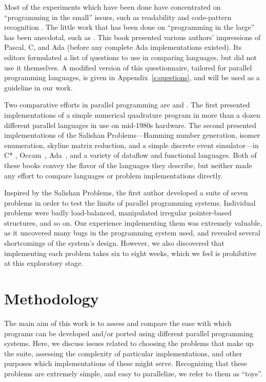 Most of the experiments which have been done have concentrated on ``programming in the small'' issues,
such as readability and code-pattern recognition
\cite{b:reverse-parsing-2,b:cloze-program-1,b:prog-comprehension-1}.
The little work that has been done on ``programming in the large'' has been anecdotal,
such as \cite{b:compare-ada-c-pascal}.
This book presented various authors' impressions of Pascal, C, and Ada
(before any complete Ada implementations existed).
Its editors formulated a list of questions to use in comparing languages,
but did not use it themselves.
A modified version of this questionnaire,
tailored for parallel programming languages,
is given in Appendix~\ref{s:questions},
and will be used as a guideline in our work.

Two comparative efforts in parallel programming are \cite{b:babb-cases} and \cite{b:salishan}.
The first presented implementations of a simple numerical quadrature program
in more than a dozen different parallel languages
in use on mid-1980s hardware.
The second presented implementations of
the Salishan Problems---Hamming number generation,
isomer enumeration,
skyline matrix reduction,
and a simple discrete event simulator---in
C* \cite{b:dataparallel-c}, Occam~\cite{b:occam}, Ada~\cite{b:ada},
and a variety of dataflow and functional languages.
Both of these books convey the flavor of the languages they describe,
but neither made any effort to compare languages or problem implementations directly.

Inspired by the Salishan Problems,
the first author developed a suite of seven problems \cite{b:cowichan-1}
in order to test the limits of parallel programming systems.
Individual problems were badly load-balanced,
manipulated irregular pointer-based structures,
and so on.
Our experience implementing them was extremely valuable,
as it uncovered many bugs in the programming system used,
and revealed several shortcomings of the system's design.
However,
we also discovered that implementing each problem takes six to eight weeks,
which we feel is prohibitive at this exploratory stage.

\section{Methodology\label{s:method}}

The main aim of this work is to assess and compare
the ease with which programs can be developed and/or ported
using different parallel programming systems.
Here,
we discuss issues related to choosing the problems that make up the suite,
assessing the complexity of particular implementations,
and other purposes which implementations of these might serve.
Recognizing that these problems are extremely simple,
and easy to parallelize,
we refer to them as ``toys''.

